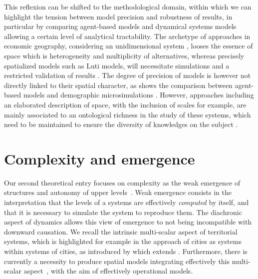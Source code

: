 \documentclass[11pt]{article}
\begin{document}
This reflexion can be shifted to the methodological domain, within which we can highlight the tension between model precision and robustness of results, in particular by comparing agent-based models and dynamical systems models allowing a certain level of analytical tractability. The archetype of approaches in economic geography, considering an unidimensional system \citep{krugman1992dynamic}, looses the essence of space which is heterogeneity and multiplicity of alternatives, whereas precisely spatialized models such as Luti models, will necessitate simulations and a restricted validation of results \citep{bonnel2014survey}. The degree of precision of models is however not directly linked to their spatial character, as shows the comparison between agent-based models and demographic microsimulations \citep{birkin2011spatial}. However, approaches including an elaborated description of space, with the inclusion of scales for example, are mainly associated to an ontological richness in the study of these systems, which need to be maintained to ensure the diversity of knowledges on the subject \citep{sanders2018survival}.


\section{Complexity and emergence}


Our second theoretical entry focuses on complexity as the weak emergence of structures and autonomy of upper levels~\citep{bedau2002downward}. Weak emergence consists in the interpretation that the levels of a systems are effectively \emph{computed} \citep{morin1980methode} by itself, and that it is necessary to simulate the system to reproduce them. The diachronic aspect of dynamics allows this view of emergence to not being incompatible with downward causation. We recall the intrinsic multi-scalar aspect of territorial systems, which is highlighted for example in the approach of cities as systems within systems of cities, as introduced by \cite{pumain1997pour} which extends \cite{berry1964cities}. Furthermore, there is currently a necessity to produce spatial models integrating effectively this multi-scalar aspect~\citep{rozenblat2018conclusion}, with the aim of effectively operational models.
\end{document}
